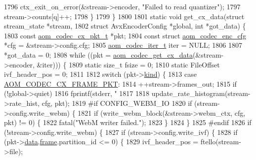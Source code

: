 \begin{DoxyCodeInclude}
{{{{{{{{{{{{{{{{{{{{{{{{{{{{{{{{{{{{{{{{{{1796     ctx\_exit\_on\_error(&stream->encoder, \textcolor{stringliteral}{"Failed to read quantizer"});
1797     stream->counts[q]++;
1798   \}
1799 \}
1800 
1801 \textcolor{keyword}{static} \textcolor{keywordtype}{void} get\_cx\_data(\textcolor{keyword}{struct} stream\_state *stream,
1802     \textcolor{keyword}{struct} AvxEncoderConfig *global, \textcolor{keywordtype}{int} *got\_data) \{
1803   \textcolor{keyword}{const} \hyperlink{structaom__codec__cx__pkt}{aom\_codec\_cx\_pkt\_t} *pkt;
1804   \textcolor{keyword}{const} \textcolor{keyword}{struct }\hyperlink{structaom__codec__enc__cfg}{aom\_codec\_enc\_cfg} *cfg = &stream->config.cfg;
1805   \hyperlink{group__codec_gadf9e173c9e02788a9999399edab20a02}{aom\_codec\_iter\_t} iter = NULL;
1806 
1807   *got\_data = 0;
1808   \textcolor{keywordflow}{while} ((pkt = \hyperlink{group__encoder_gaedc4c56b60d4217677cb561066360884}{aom\_codec\_get\_cx\_data}(&stream->encoder, &iter))) \{
1809     \textcolor{keyword}{static} \textcolor{keywordtype}{size\_t} fsize = 0;
1810     \textcolor{keyword}{static} FileOffset ivf\_header\_pos = 0;
1811 
1812     \textcolor{keywordflow}{switch} (pkt->\hyperlink{structaom__codec__cx__pkt_a11e586120c689ece9a7690e72ff384be}{kind}) \{
1813     \textcolor{keywordflow}{case} \hyperlink{group__encoder_ggafeb69da4a9649a54e805f59c26d8dfeda793165d0f219812342f69d5fd9b2b9c8}{AOM\_CODEC\_CX\_FRAME\_PKT}:
1814       ++stream->frames\_out;
1815       \textcolor{keywordflow}{if} (!global->quiet)
1816         fprintf(stderr, \textcolor{stringliteral}{" %
1817 
1818       update\_rate\_histogram(stream->rate\_hist, cfg, pkt);
1819 \textcolor{preprocessor}{#if CONFIG\_WEBM\_IO}
1820       \textcolor{keywordflow}{if} (stream->config.write\_webm) \{
1821         \textcolor{keywordflow}{if} (write\_webm\_block(&stream->webm\_ctx, cfg, pkt) != 0) \{
1822           fatal(\textcolor{stringliteral}{"WebM writer failed."});
1823         \}
1824       \}
1825 \textcolor{preprocessor}{#endif}
1826       \textcolor{keywordflow}{if} (!stream->config.write\_webm) \{
1827         \textcolor{keywordflow}{if} (stream->config.write\_ivf) \{
1828           \textcolor{keywordflow}{if} (pkt->\hyperlink{structaom__codec__cx__pkt_afb379cd4bfa7692d1d6e85f4e4b2b410}{data}.\hyperlink{structaom__codec__cx__pkt_a4180a6ae59b0d295bc915d4689df4cb0}{frame}.partition\_id <= 0) \{
1829             ivf\_header\_pos = ftello(stream->file);
}}}}}}}}}}}}}}}}}}}}}}}}}}}}}}}}}}}}}}}}}}}
\end{DoxyCodeInclude}
